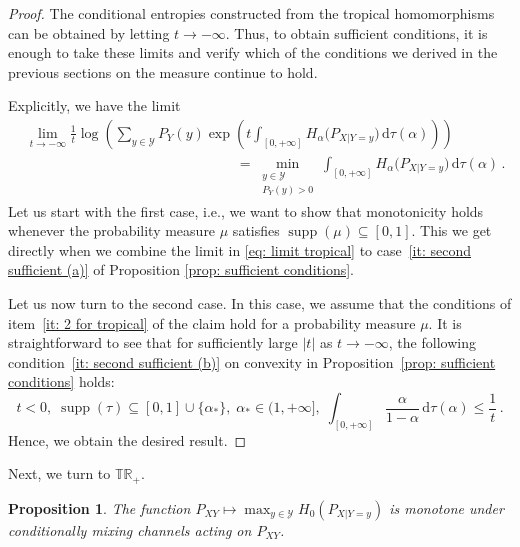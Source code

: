 \documentclass[aps,pra,11pt,onecolumn,nofootinbib,tightenlines]{revtex4-2}
\newtheorem{proposition}[theorem]{Proposition}
\theoremstyle{definition}
\newcommand{\Y}{\mathcal{Y}}
\newcommand{\mb}[1]{\mathbb{#1}}
\begin{document}
\begin{proof}
    The conditional entropies constructed from the tropical homomorphisms can be obtained by letting $t\to-\infty$. Thus, to obtain sufficient conditions, it is enough to take these limits and verify which of the conditions we derived in the previous sections on the measure continue to hold. 
    
    Explicitly, we have the limit
    \begin{align}
    \label{eq: limit tropical}
&\lim_{t \to -\infty} \frac{1}{t} 
\log\left( \sum_{y \in \mathcal{Y}} P_Y(y) 
\exp\left( t \int_{[0,+\infty]} H_\alpha\big(P_{X|Y = y}\big) \,\mathrm{d}\tau(\alpha) \right) \right) \\
&\hspace{15em}= \min \limits_{\substack{y \in \mathcal{Y} \\ P_Y( y) > 0}} \int_{[0,+\infty]} H_\alpha\big(P_{X|Y = y}\big) \,\mathrm{d}\tau(\alpha) \,.
\end{align}
Let us start with the first case, i.e., we want to show that monotonicity holds whenever the probability measure $\mu$ satisfies $\operatorname{supp}(\mu) \subseteq [0,1]$. This we get directly when we combine the limit in \eqref{eq: limit tropical} to case~\ref{it: second sufficient (a)} of Proposition \ref{prop: sufficient conditions}.

Let us now turn to the second case.
In this case, we assume that the conditions of item~\ref{it: 2 for tropical} of the claim hold for a probability measure $\mu$.  
It is straightforward to see that for sufficiently large $|t|$ as $t\rightarrow-\infty$, the following condition~\ref{it: second sufficient (b)} on convexity in Proposition~\ref{prop: sufficient conditions} holds:
\begin{equation}
\label{eq: condition mu for M}
t<0,\;\operatorname{supp}(\tau) \subseteq [0,1] \cup \{\alpha_*\},\;
\alpha_* \in (1, +\infty],\;
\int_{[0,+\infty]} \frac{\alpha}{1 - \alpha} \,\mathrm{d}\tau(\alpha) \leq \frac{1}{t} \,.
\end{equation}
Hence, we obtain the desired result.
\end{proof}
Next, we turn to $\mb{TR}_+$.
\begin{proposition}
\label{prop: sufficient tropical no}
The function $P_{XY} \longmapsto \max_{y \in \Y}   H_0(P_{X|Y=y})$
is monotone under conditionally mixing channels acting on $P_{XY}$. 
\end{proposition}
\end{document}
